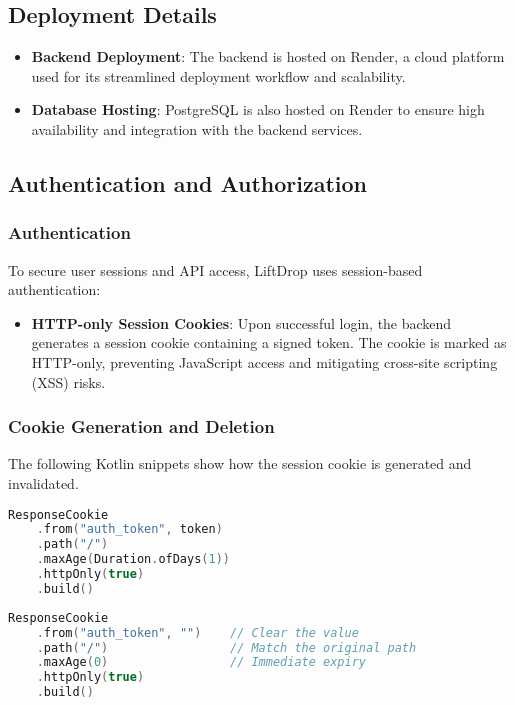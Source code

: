 \subsection{Deployment Details}

\begin{itemize}
    \item \textbf{Backend Deployment}: The backend is hosted on Render, a cloud platform used for its streamlined deployment workflow and scalability.
    \item \textbf{Database Hosting}: PostgreSQL is also hosted on Render to ensure high availability and integration with the backend services.
\end{itemize}

\subsection{Authentication and Authorization}

\subsubsection{Authentication}

To secure user sessions and API access, LiftDrop uses session-based authentication:

\begin{itemize}
    \item \textbf{HTTP-only Session Cookies}: Upon successful login, the backend generates a session cookie containing a signed token. The cookie is marked as HTTP-only, preventing JavaScript access and mitigating cross-site scripting (XSS) risks.
\end{itemize}

\subsubsection{Cookie Generation and Deletion}

The following Kotlin snippets show how the session cookie is generated and invalidated.

\begin{lstlisting}[language=Kotlin, caption={Generating the Session Cookie}]
ResponseCookie
    .from("auth_token", token)
    .path("/")
    .maxAge(Duration.ofDays(1))
    .httpOnly(true)
    .build()
\end{lstlisting}

\begin{lstlisting}[language=Kotlin, caption={Deleting the Session Cookie}]
ResponseCookie
    .from("auth_token", "")    // Clear the value
    .path("/")                 // Match the original path
    .maxAge(0)                 // Immediate expiry
    .httpOnly(true)
    .build()
\end{lstlisting}

